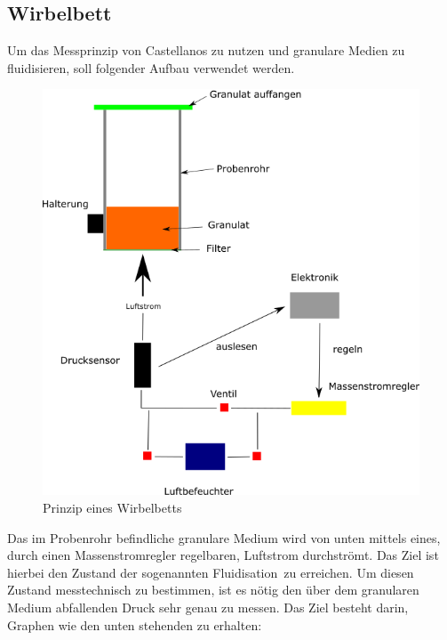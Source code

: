 \subsection{Wirbelbett}

Um das Messprinzip von Castellanos zu nutzen und granulare Medien zu fluidisieren, soll folgender Aufbau verwendet werden.


\begin{figure}[h]
		\begin{center}

		\includegraphics[scale=0.65]{Prinzip_Wirbelbett.png}
		\caption{Prinzip eines Wirbelbetts}
	\end{center}
\end{figure}	


Das im Probenrohr befindliche granulare Medium wird von unten mittels eines, durch einen Massenstromregler regelbaren, Luftstrom durchströmt. Das Ziel ist hierbei den Zustand der sogenannten \glqq Fluidisation\grqq \ zu erreichen. Um diesen Zustand messtechnisch zu bestimmen, ist es nötig den über dem granularen Medium abfallenden Druck sehr genau zu messen. Das Ziel besteht darin, Graphen wie den unten stehenden zu erhalten:

